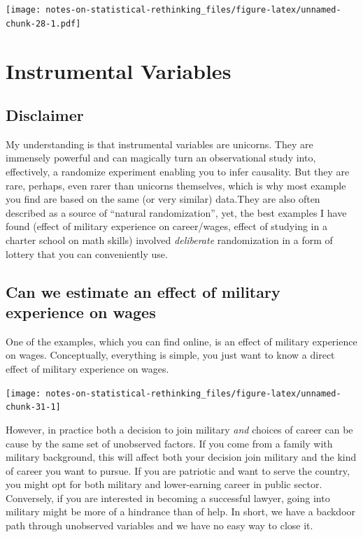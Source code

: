 \documentclass[
]{book}
\begin{document}
\texttt{[image: notes-on-statistical-rethinking\_files/figure-latex/unnamed-chunk-28-1.pdf]}

\hypertarget{instrumental-variables}{%
\chapter{Instrumental Variables}\label{instrumental-variables}}

\hypertarget{disclaimer}{%
\section*{Disclaimer}\label{disclaimer}}

My understanding is that instrumental variables are unicorns. They are immensely powerful and can magically turn an observational study into, effectively, a randomize experiment enabling you to infer causality. But they are rare, perhaps, even rarer than unicorns themselves, which is why most example you find are based on the same (or very similar) data.They are also often described as a source of ``natural randomization'', yet, the best examples I have found (effect of military experience on career/wages, effect of studying in a charter school on math skills) involved \emph{deliberate} randomization in a form of lottery that you can conveniently use.

\hypertarget{can-we-estimate-an-effect-of-military-experience-on-wages}{%
\section*{Can we estimate an effect of military experience on wages}\label{can-we-estimate-an-effect-of-military-experience-on-wages}}

One of the examples, which you can find online, is an effect of military experience on wages. Conceptually, everything is simple, you just want to know a direct effect of military experience on wages.

\begin{center}\texttt{[image: notes-on-statistical-rethinking\_files/figure-latex/unnamed-chunk-31-1]} \end{center}

However, in practice both a decision to join military \emph{and} choices of career can be cause by the same set of unobserved factors. If you come from a family with military background, this will affect both your decision join military and the kind of career you want to pursue. If you are patriotic and want to serve the country, you might opt for both military and lower-earning career in public sector. Conversely, if you are interested in becoming a successful lawyer, going into military might be more of a hindrance than of help. In short, we have a backdoor path through unobserved variables and we have no easy way to close it.
\end{document}

